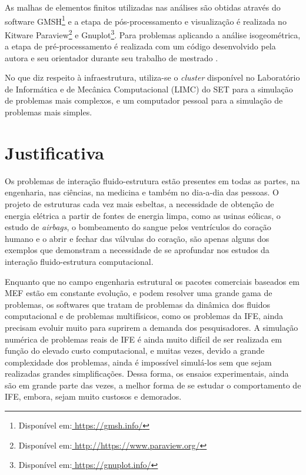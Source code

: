 \documentclass[tese_patricia.tex]{subfiles}
\begin{document}
As malhas de elementos finitos utilizadas nas análises são obtidas através do software GMSH\footnote{Disponível em:\url{ https://gmsh.info/}} e a etapa de pós-processamento e visualização é realizada no Kitware Paraview\footnote{Disponível em:\url{ http://https://www.paraview.org/}} e  Gnuplot\footnote{Disponível em:\url{ https://gnuplot.info/}}. Para problemas aplicando a análise isogeométrica, a etapa de pré-processamento é realizada com um código desenvolvido pela autora e seu orientador durante seu trabalho de mestrado \cite{Tonon:2016}.

No que diz respeito à infraestrutura, utiliza-se o \textit{cluster} disponível no Laboratório de Informática e de Mecânica Computacional (LIMC) do SET para a simulação de problemas mais complexos, e um computador pessoal para a simulação de problemas mais simples.


 \section[Justificativa]{Justificativa}

Os problemas de interação fluido-estrutura estão presentes em todas as partes, na engenharia, nas ciências, na medicina e também no dia-a-dia das pessoas.
O projeto de estruturas cada vez mais esbeltas, a necessidade de obtenção de energia elétrica a partir de fontes de energia limpa, como as usinas eólicas, o estudo de \textit{airbags}, o bombeamento do sangue pelos ventrículos do coração humano e o abrir e fechar das válvulas do coração, são apenas alguns dos exemplos que demonstram a necessidade de se aprofundar nos estudos da interação fluido-estrutura computacional.

Enquanto que no campo engenharia estrutural os pacotes comerciais baseados em MEF estão em constante evolução, e podem resolver uma grande gama de problemas, os softwares que tratam de problemas da dinâmica dos fluidos computacional e de problemas multifísicos, como os problemas da IFE, ainda precisam evoluir muito para suprirem a demanda dos pesquisadores. A simulação numérica de problemas reais de IFE é ainda muito difícil de ser realizada em função do elevado custo computacional, e muitas vezes, devido a grande complexidade dos problemas, ainda é impossível simulá-los sem que sejam realizadas grandes simplificações. Dessa forma, os ensaios experimentais, ainda são em grande parte das vezes, a melhor forma de se estudar o comportamento de IFE, embora, sejam muito custosos e demorados.
\end{document}
